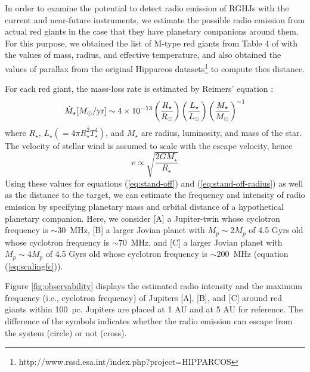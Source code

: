 \documentclass{emulateapj}
\def\memoYF#1{\color{red}$[${\bf #1}$]$ \color{black}}
\begin{document}
In order to examine the potential to detect radio emission of RGHJs with the current and near-future instruments, we estimate the possible radio emission from actual red giants in the case that they have planetary companions around them. 
For this purpose, we obtained the list of M-type red giants from Table 4 of \citet{dumm1998} with the values of mass, radius, and effective temperature, and also obtained the values of parallax from the original Hipparcos datasets\footnote{http://www.rssd.esa.int/index.php?project=HIPPARCOS} to compute thes distance.

For each red giant, the mass-loss rate is estimated by Reimers' equation \citep{reimers1975}:
\begin{equation}
\dot M_\star [M_\odot{\rm /yr}] \sim 4 \times 10^{-13} \left( \frac{R_{\star }}{R_{\odot }} \right)\left( \frac{L_{\star }}{L_{\odot }} \right) \left( \frac{M_\star}{M_\odot} \right)^{-1}
\end{equation}
where $R_{\star }$, $L_{\star } (=4\pi R_{\star }^2 T_{\star }^4)$, and $M_{\star}$ are radius, luminosity, and mass of the star. 
The velocity of stellar wind is assumed to scale with the escape velocity, hence
\begin{equation}
v \propto \sqrt{\frac{2GM_\star}{R_{\star }}}
\end{equation}
Using these values for equations (\ref{eq:stand-off}) and (\ref{eq:stand-off-radius}) as well as the distance to the target, we can estimate the frequency and intensity of radio emission by specifying planetary mass and orbital distance of a hypothetical planetary companion. 
Here, we consider [A] a Jupiter-twin whose cyclotron frequency is $\sim 30$~MHz, [B] a larger Jovian planet with $M_p\sim 2M_p$ of 4.5 Gyrs old whose cyclotron frequency is $\sim 70$~MHz, and [C] a larger Jovian planet with $M_p\sim 4M_p$ of 4.5 Gyrs old whose cyclotron frequency is $\sim 200$~MHz
  (equation (\ref{eq:scalingfc})).  

Figure \ref{fig:observability} displays the estimated radio intensity and the maximum frequency (i.e., cyclotron frequency) of Jupiters [A], [B], and [C]  around red giants within 100~pc. 
Jupiters are placed at 1 AU and at 5 AU for reference. 
The difference of the symbols indicates whether the radio emission can escape from the system (circle) or not (cross). 

\end{document}
